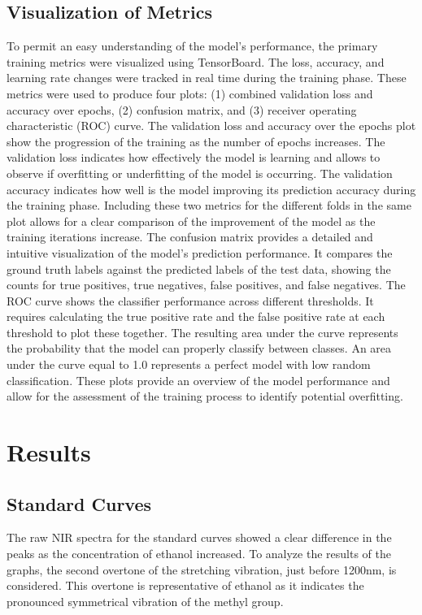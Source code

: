 \documentclass[12pt]{report}
\renewcommand{\cite}{\supercite}
\begin{document}
\subsection{Visualization of Metrics}
To permit an easy understanding of the model’s performance, the primary training metrics were visualized using TensorBoard. The loss, accuracy, and learning rate changes were tracked in real time during the training phase. These metrics were used to produce four plots: (1) combined validation loss and accuracy over epochs, (2) confusion matrix, and (3) receiver operating characteristic (ROC) curve. The validation loss and accuracy over the epochs plot show the progression of the training as the number of epochs increases. The validation loss indicates how effectively the model is learning and allows to observe if overfitting or underfitting of the model is occurring. The validation accuracy indicates how well is the model improving its prediction accuracy during the training phase. Including these two metrics for the different folds in the same plot allows for a clear comparison of the improvement of the model as the training iterations increase. The confusion matrix provides a detailed and intuitive visualization of the model’s prediction performance.\cite{AsynchronousEEGbasedBCIhernandez-del-toro2021} It compares the ground truth labels against the predicted labels of the test data, showing the counts for true positives, true negatives, false positives, and false negatives. The ROC curve shows the classifier performance across different thresholds. It requires calculating the true positive rate and the false positive rate at each threshold to plot these together. The resulting area under the curve represents the probability that the model can properly classify between classes. An area under the curve equal to 1.0 represents a perfect model with low random classification. These plots provide an overview of the model performance and allow for the assessment of the training process to identify potential overfitting.

\section{Results}

\subsection{Standard Curves}

The raw NIR spectra for the standard curves showed a clear difference in the peaks as the concentration of ethanol increased. To analyze the results of the graphs, the second overtone of the  stretching vibration, just before 1200nm, is considered. This overtone is representative of ethanol as it indicates the pronounced symmetrical vibration of the methyl group.
\end{document}
